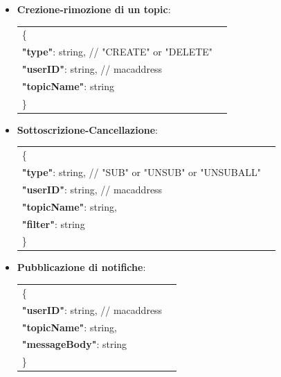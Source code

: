 \documentclass{article}
\begin{document}
\begin{itemize}

\item{\textbf{Crezione-rimozione di un topic}:}

\begin{tabular}{ll}
\{\\
	   \hspace{10mm} \textbf{"type"}: string, // "CREATE" or "DELETE"\\
              \hspace{10mm} \textbf{"userID"}: string, // macaddress\\
              \hspace{10mm} \textbf{"topicName"}: string
\\
\}
\end{tabular}

\item{\textbf{Sottoscrizione-Cancellazione}:}

\begin{tabular}{ll}
\{\\	   
            \hspace{10mm} \textbf{"type"}: string, // "SUB" or "UNSUB" or "UNSUBALL"\\
            \hspace{10mm} \textbf{"userID"}: string, // macaddress\\
            \hspace{10mm} \textbf{"topicName"}: string,\\
            \hspace{10mm} \textbf{"filter"}: string 
\\
\}
\end{tabular}

\item{\textbf{Pubblicazione di notifiche}:}

\begin{tabular}{ll}
\{\\	   
           \hspace{10mm} \textbf{"userID"}: string, // macaddress\\
           \hspace{10mm} \textbf{"topicName"}: string,\\
           \hspace{10mm} \textbf{"messageBody"}: string
\\
\}
\end{tabular}

\end{itemize}
\end{document}
